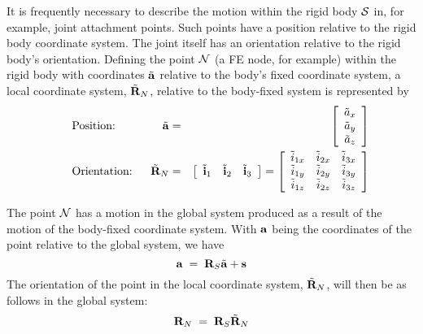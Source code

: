 It is frequently necessary to describe the motion within the rigid body $\cal S$
in, for example, joint attachment points.
Such points have a position relative to the rigid body coordinate system.
The joint itself has an orientation relative to the rigid body's orientation.
Defining the point $\cal N$ (a FE node, for example) within the rigid body with
coordinates $\tilde{\bf a}$ relative to the body's fixed coordinate system,
a local coordinate system, $\tilde{\bf R}_N$, relative to the body-fixed
system is represented by
%
\begin{eqnarray}
\makebox[28mm]{Position:\hfill} \tilde{\mf a} &=&
\left[\begin{array}{c}
\tilde{a}_x \\ \tilde{a}_y \\ \tilde{a}_z \end{array}\right] \\
\makebox[30mm]{Orientation:} \tilde{\mf R}_N &=&
\left[\begin{array}{ccc} \tilde{\mf i}_1 & \tilde{\mf i}_2 & \tilde{\mf i}_3
\end{array}\right] = \left[\begin{array}{ccc}
\tilde{i}_{1x} & \tilde{i}_{2x} & \tilde{i}_{3x} \\
\tilde{i}_{1y} & \tilde{i}_{2y} & \tilde{i}_{3y} \\
\tilde{i}_{1z} & \tilde{i}_{2z} & \tilde{i}_{3z}
\end{array}\right]
\end{eqnarray}

The point $\cal N$ has a motion in the global system produced as a result of the
motion of the body-fixed coordinate system.
With $\bf a$ being the coordinates of the point relative to the global system,
we have
%
\begin{equation}
{\bf a} \;=\; {\bf R}_S\tilde{\bf a} + {\bf s}
\end{equation}
%
The orientation of the point in the local coordinate system, $\tilde{\bf R}_N$,
will then be as follows in the global system:
%
\begin{equation}
{\bf R}_N \;=\; {\bf R}_S \tilde{\bf R}_N
\end{equation}

